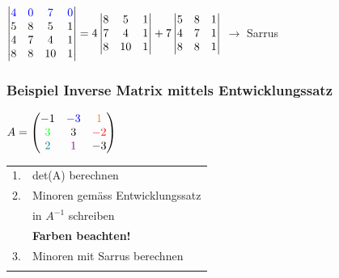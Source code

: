 		    	\vspace{0.3cm}
			
			$\begin{vmatrix}
		    	\color{blue}4 & \color{blue}0 & \color{blue}7 & \color{blue}0 \\
		    	5 & 8 & 5 & 1 \\
		    	4 & 7 & 4 & 1 \\
		    	8 & 8 & 10 & 1 
		    	\end{vmatrix}  =  4 	\begin{vmatrix}
		    						 8 & 5 & 1 \\ 7 & 4 & 1 \\ 8 									& 10 & 1 
								\end{vmatrix} + 7 												\begin{vmatrix}
								5 & 8 & 1 \\ 4 & 7 & 1 \\ 8 & 								8 & 1 
								\end{vmatrix}$ \quad $\rightarrow$ Sarrus \\						 		    
		    
			\subsubsection{Beispiel Inverse Matrix mittels Entwicklungssatz}
			
			$A = \begin{pmatrix}
		    		-1 & \color{blue}-3 & \color{orange}1 \\
		    		\color{green}3 & 3 & \color{red}-2  \\
		    		\color{teal}2 & \color{violet}1 & -3  \\
		    		\end{pmatrix}$  \quad  \begin{tabular}{ll}
		    		1. & det(A) berechnen \\
		    		2. & Minoren gemäss Entwicklungssatz \\
		    		& in $A^{-1}$ schreiben \\
		    		& \textbf{Farben beachten!} \\
		    		3.& Minoren mit Sarrus berechnen \\
		    		\\
					\end{tabular}						

